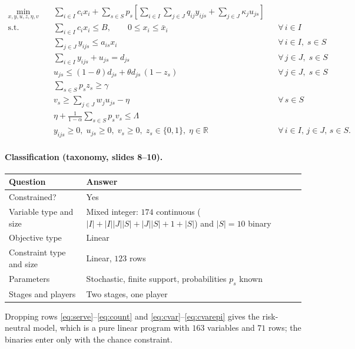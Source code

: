 \documentclass[11pt]{article}
\DeclareMathOperator*{\minimize}{min}
\theoremstyle{definition}\newtheorem*{definition}{Definition}
\theoremstyle{definition}
\begin{document}
\begin{align}
  \minimize_{x,y,u,z,\eta,v} \quad
    & \sum_{i \in I} c_i x_i
      + \sum_{s \in S} p_s \left[
        \sum_{i \in I}\sum_{j \in J} q_{ij} y_{ijs}
        + \sum_{j \in J} \kappa_j u_{js} \right] \\
  \text{s.t.}\quad
    & \sum_{i \in I} c_i x_i \le B,
      \qquad 0 \le x_i \le \bar{x}_i
      && \forall\, i \in I \\
    & \sum_{j \in J} y_{ijs} \le a_{is} x_i
      && \forall\, i \in I,\; s \in S \\
    & \sum_{i \in I} y_{ijs} + u_{js} = d_{js}
      && \forall\, j \in J,\; s \in S \\
    & u_{js} \le (1-\theta) d_{js} + \theta d_{js}\,(1-z_s)
      && \forall\, j \in J,\; s \in S \\
    & \sum_{s \in S} p_s z_s \ge \gamma \\
    & v_s \ge \sum_{j \in J} w_j u_{js} - \eta
      && \forall\, s \in S \\
    & \eta + \frac{1}{1-\alpha}\sum_{s \in S} p_s v_s \le \Lambda \\
    & y_{ijs} \ge 0,\; u_{js} \ge 0,\; v_s \ge 0,\;
      z_s \in \{0,1\},\; \eta \in \mathbb{R}
      && \forall\, i \in I,\, j \in J,\, s \in S .
\end{align}

\paragraph{Classification (taxonomy, slides 8--10).}

\begin{center}
\begin{tabular}{@{}ll@{}}
\toprule
Question & Answer \\
\midrule
Constrained? & Yes \\
Variable type and size & Mixed integer: $174$ continuous
  ($|I| + |I||J||S| + |J||S| + 1 + |S|$) and $|S| = 10$ binary \\
Objective type & Linear \\
Constraint type and size & Linear, $123$ rows \\
Parameters & Stochastic, finite support, probabilities $p_s$ known \\
Stages and players & Two stages, one player \\
\bottomrule
\end{tabular}
\end{center}

Dropping rows \eqref{eq:serve}--\eqref{eq:count} and
\eqref{eq:cvar}--\eqref{eq:cvarepi} gives the risk-neutral model, which
is a pure linear program with $163$ variables and $71$ rows; the binaries
enter only with the chance constraint.
\end{document}
